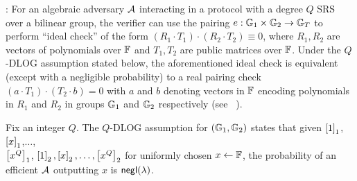 \smallskip

: For an algebraic adversary $\mathcal{A}$ interacting in a protocol with a degree $Q$ SRS over a bilinear group, the verifier
can use the pairing $e:\mathbb{G}_1\times \mathbb{G}_2\rightarrow \mathbb{G}_T$ to perform ``ideal check'' of the form $(R_1\cdot T_1)\cdot (R_2\cdot T_2)\equiv 0$, where $R_1,R_2$ are
vectors of polynomials over $\mathbb{F}$ and $T_1, T_2$ are public matrices over $\mathbb{F}$.
Under the $Q$-DLOG assumption stated below, the aforementioned ideal check
is equivalent (except with a negligible probability) to a real pairing check $(a\cdot T_1)\cdot (T_2\cdot b)=0$ with $a$ and $b$ denoting vectors in $\mathbb{F}$ encoding polynomials in $R_1$ and $R_2$ in
groups $\mathbb{G}_1$ and $\mathbb{G}_2$ respectively (see ~\cite[Lemma 2.2]{Gabizon2019PLONKPO}).

\begin{definition}\label{defn:q-dlog}
Fix an integer $Q$. The $Q$-DLOG assumption for $(\mathbb{G}_1,\mathbb{G}_2)$ states that given $\left[{1}\right]_1$,$\left[{x}\right]_1$,$\ldots$, \\
$\left[{x^Q}\right]_1$, $\left[{1}\right]_2,\left[{x}\right]_2,\ldots,\left[{x^Q}\right]_2$ for
uniformly chosen $x\gets \mathbb{F}$, the probability of an efficient $\mathcal{A}$ outputting $x$ is $\mathsf{negl}(\lambda)$.
\end{definition}


